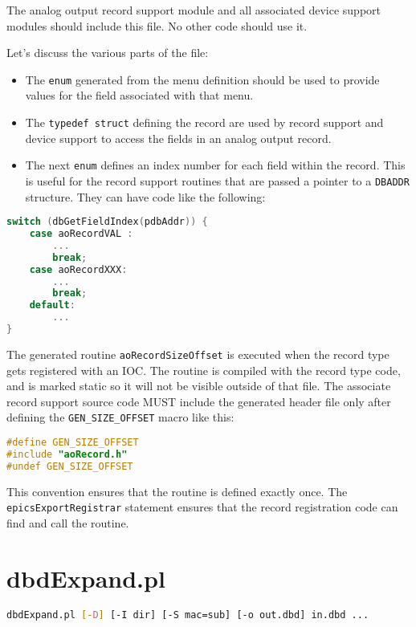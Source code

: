 The analog output record support module and all associated device support modules should include this file.
No other code should use it.

Let's discuss the various parts of the file:

\begin{itemize}
\item The \verb|enum| generated from the menu definition should be used to provide values for the field associated with that menu.

\item The \verb|typedef struct| defining the record are used by record support and device support to access the fields in an analog output record.

\item The next \verb|enum| defines an index number for each field within the record.
This is useful for the record support routines that are passed a pointer to a \verb|DBADDR| structure.
They can have code like the following:

\end{itemize}

\begin{lstlisting}[language=C]
switch (dbGetFieldIndex(pdbAddr)) {
    case aoRecordVAL :
        ...
        break;
    case aoRecordXXX:
        ...
        break;
    default:
        ...
}
\end{lstlisting}

The generated routine \verb|aoRecordSizeOffset| is executed when the record type gets registered with an IOC.
The routine is compiled with the record type code, and is marked static so it will not be visible outside of that file.
The associate record support source code MUST include the generated header file only after defining the \verb|GEN_SIZE_OFFSET| macro like this:

\begin{lstlisting}[language=C]
#define GEN_SIZE_OFFSET
#include "aoRecord.h"
#undef GEN_SIZE_OFFSET
\end{lstlisting}

This convention ensures that the routine is defined exactly once.
The \verb|epicsExportRegistrar| statement ensures that the record registration code can find and call the routine.

\section{dbdExpand.pl}

\begin{lstlisting}[language=sh]
dbdExpand.pl [-D] [-I dir] [-S mac=sub] [-o out.dbd] in.dbd ...
\end{lstlisting}

